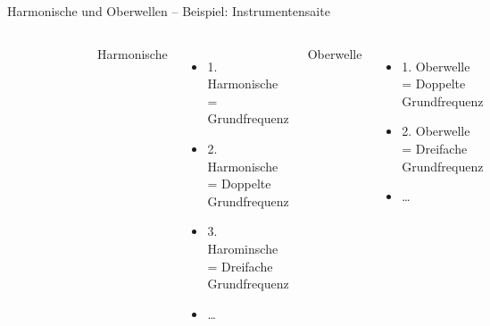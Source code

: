 \begin{frame}{Harmonische und Oberwellen -- Beispiel: Instrumentensaite}
  \begin{columns}[c]
    \begin{figure}
      \includegraphics[width=\textwidth,height=\textheight,keepaspectratio]{a11/512px-Moodswingerscale.png}
    \end{figure}
    Harmonische
    \begin{itemize}
      \item 1. Harmonische = Grundfrequenz
      \item 2. Harmonische = Doppelte Grundfrequenz
      \item 3. Harominsche = Dreifache Grundfrequenz
      \item \ldots
    \end{itemize}
    Oberwelle
    \begin{itemize}
      \item 1. Oberwelle = Doppelte Grundfrequenz
      \item 2. Oberwelle = Dreifache Grundfrequenz
      \item \ldots
    \end{itemize}
  \end{columns}
\end{frame}

